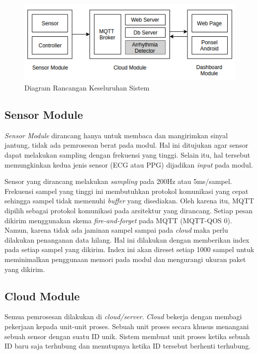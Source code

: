 \documentclass[]{indojc_single}
\begin{document}
\begin{figure}[htbp]
\centerline{\includegraphics[scale=0.65]{images/overall.png}}
\caption{Diagram Rancangan Keseluruhan Sistem }
\label{fig:overall_diagram}
\end{figure}

\subsection{Sensor Module}
\textit{Sensor Module} dirancang hanya untuk membaca dan mangirimkan sinyal jantung, tidak ada pemrosesan berat pada modul. Hal ini ditujukan agar sensor dapat melakukan sampling dengan frekuensi yang tinggi. Selain itu, hal tersebut memungkinkan kedua jenis sensor (ECG atau PPG) dijadikan \textit{input} pada modul. 

Sensor yang dirancang melakukan \textit{sampling} pada 200Hz atau 5ms/sampel. Frekuensi sampel yang tinggi ini membutuhkan protokol komunikasi yang cepat sehingga sampel tidak memenuhi \textit{buffer} yang disediakan. Oleh karena itu, MQTT dipilih sebagai protokol komunikasi pada arsitektur yang dirancang. Setiap pesan dikirim menggunakan skema \textit{fire-and-forget} pada MQTT (MQTT-QOS 0). Namun, karena tidak ada jaminan sampel sampai pada \textit{cloud} maka perlu dilakukan penanganan data hilang. Hal ini dilakukan dengan memberikan index pada setiap sampel yang dikirim. Index ini akan direset setiap 1000 sampel untuk meminimalkan penggunaan memori pada modul dan mengurangi ukuran paket yang dikirim.

\subsection{Cloud Module}
Semua pemrosesan dilakukan di \textit{cloud/server}. \textit{Cloud} bekerja dengan membagi pekerjaan kepada unit-unit proses. Sebuah unit proses secara khusus menangani sebuah sensor dengan suatu ID unik. Sistem membuat unit proses ketika sebuah ID baru saja terhubung dan menutupnya ketika ID tersebut berhenti terhubung. 
\end{document}
